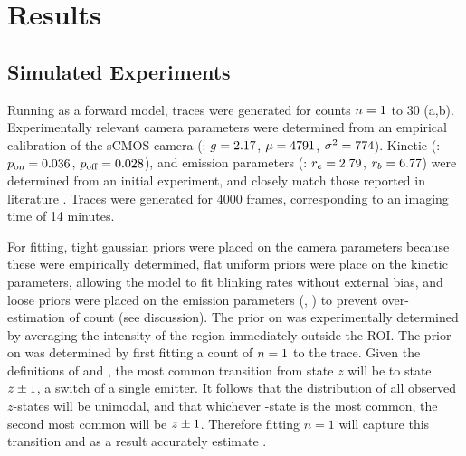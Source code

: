 \section{Results}






\subsection{Simulated Experiments}
Running \ours as a forward model, traces were generated for counts $n=1$ to 30
	(a,b).
	Experimentally relevant camera parameters were determined from an empirical calibration of the
	sCMOS camera (\parametersc: $g=2.17$, $\mu=4791$, $\sigma^2=774$). 
	Kinetic (\parameterst: $p_\text{on}=0.036$, $p_\text{off}=0.028$), and emission parameters 
	(\parameterse: $r_e=2.79$, $r_b=6.77$) were determined from an
	initial experiment, and closely match those reported in literature \cite{stein_2021}.
	Traces were generated for 4000 frames, corresponding to an imaging time of 14 minutes.

For fitting, tight gaussian priors were placed on the camera parameters because these were empirically determined,
	flat uniform priors were place on the kinetic parameters, allowing the model 
	to fit blinking rates without external bias,
	and loose priors were placed on the emission parameters (\rb, \re) to prevent 
	over-estimation of count (see discussion). 
	The prior on \rb was experimentally determined by averaging the 
	intensity of the region immediately outside the ROI.
	The prior on \re was determined by first fitting a count of $n=1$ to the trace.
	Given the definitions of \pon and \poff, the most common transition 
	from state $z$ will be to state $z_{} \pm 1$, a switch of a single emitter.
	It follows that the distribution of all observed $z$-states will be unimodal, 
	and that whichever \z{}-state is the most common, the second most common 
	will be $z_{} \pm 1$. 
	Therefore fitting $n=1$ will capture this transition and as a result 
	accurately estimate \re.
	
